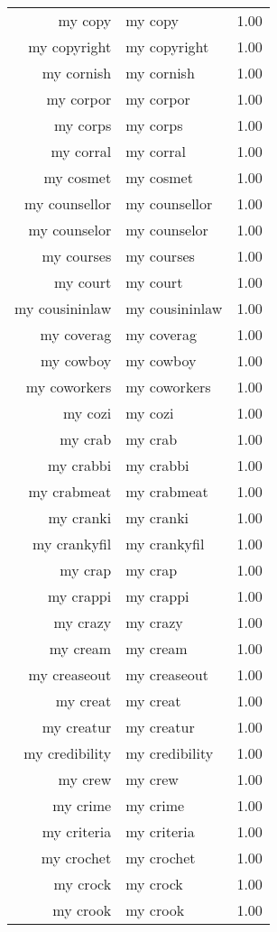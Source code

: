 \begin{table}[ht]
\begin{tabular}{rlr}
  my copy & my copy & 1.00 \\ 
  my copyright & my copyright & 1.00 \\ 
  my cornish & my cornish & 1.00 \\ 
  my corpor & my corpor & 1.00 \\ 
  my corps & my corps & 1.00 \\ 
  my corral & my corral & 1.00 \\ 
  my cosmet & my cosmet & 1.00 \\ 
  my counsellor & my counsellor & 1.00 \\ 
  my counselor & my counselor & 1.00 \\ 
  my courses & my courses & 1.00 \\ 
  my court & my court & 1.00 \\ 
  my cousininlaw & my cousininlaw & 1.00 \\ 
  my coverag & my coverag & 1.00 \\ 
  my cowboy & my cowboy & 1.00 \\ 
  my coworkers & my coworkers & 1.00 \\ 
  my cozi & my cozi & 1.00 \\ 
  my crab & my crab & 1.00 \\ 
  my crabbi & my crabbi & 1.00 \\ 
  my crabmeat & my crabmeat & 1.00 \\ 
  my cranki & my cranki & 1.00 \\ 
  my crankyfil & my crankyfil & 1.00 \\ 
  my crap & my crap & 1.00 \\ 
  my crappi & my crappi & 1.00 \\ 
  my crazy & my crazy & 1.00 \\ 
  my cream & my cream & 1.00 \\ 
  my creaseout & my creaseout & 1.00 \\ 
  my creat & my creat & 1.00 \\ 
  my creatur & my creatur & 1.00 \\ 
  my credibility & my credibility & 1.00 \\ 
  my crew & my crew & 1.00 \\ 
  my crime & my crime & 1.00 \\ 
  my criteria & my criteria & 1.00 \\ 
  my crochet & my crochet & 1.00 \\ 
  my crock & my crock & 1.00 \\ 
  my crook & my crook & 1.00 \\ 

\end{tabular}
\end{table}
